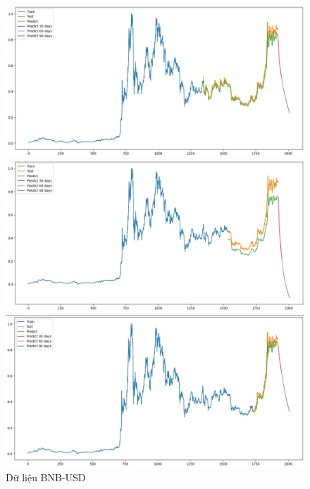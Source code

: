 \documentclass[conference]{IEEEtran}
\begin{document}
\begin{figure}[H]
    \centering
    \begin{minipage}{0.15\textwidth}
    \centering
    \includegraphics[width=1\textwidth]{Figure/LSTM_BNB_7.jpg}
    \end{minipage}
    \hfill
    \begin{minipage}{0.15\textwidth}
    \centering
    \includegraphics[width=1\textwidth]{Figure/LSTM_BNB_8.jpg}
    \end{minipage}
    \hfill
    \begin{minipage}{0.15\textwidth}
    \centering
    \includegraphics[width=1\textwidth]{Figure/LSTM_BNB_9.jpg}
    \end{minipage}
    \caption{Dữ liệu BNB-USD}
    \label{fig:1}
\end{figure}
\end{document}
